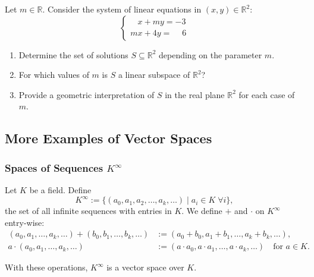\begin{exercise}
\label{exc:parametric_linear_system_subspace}
Let $m \in \mathbb{R}$. Consider the system of linear equations in $(x, y) \in \mathbb{R}^2$:
\[
\begin{cases}
\phantom{m}x + my = -3 \\
mx + 4y = \phantom{-}6
\end{cases}
\]
\begin{enumerate}
    \item Determine the set of solutions $S \subseteq \mathbb{R}^2$ depending on the parameter $m$.
    \item For which values of $m$ is $S$ a linear subspace of $\mathbb{R}^2$?
    \item Provide a geometric interpretation of $S$ in the real plane $\mathbb{R}^2$ for each case of $m$.
\end{enumerate}
\end{exercise}

\subsection{More Examples of Vector Spaces}

\subsubsection{Spaces of Sequences \texorpdfstring{$K^\infty$}{K to the infinity}}

\begin{example}
\label{ex:sequence_space}
Let $K$ be a field. Define
\[
K^\infty := \{(a_0, a_1, a_2, \dots, a_k, \dots) \mid a_i \in K \; \forall i\},
\]
the set of all infinite sequences with entries in $K$. We define $+$ and $\cdot$ on $K^\infty$ entry-wise:
\begin{align*}
(a_0, a_1, \dots, a_k, \dots) + (b_0, b_1, \dots, b_k, \dots) &:= (a_0 + b_0, a_1 + b_1, \dots, a_k + b_k, \dots), \\
a \cdot (a_0, a_1, \dots, a_k, \dots) &:= (a \cdot a_0, a \cdot a_1, \dots, a \cdot a_k, \dots) \quad \text{for } a \in K.
\end{align*}
\end{example}

\begin{exercise}
\label{exc:sequence_space_axioms}
With these operations, $K^\infty$ is a vector space over $K$.
\end{exercise}

